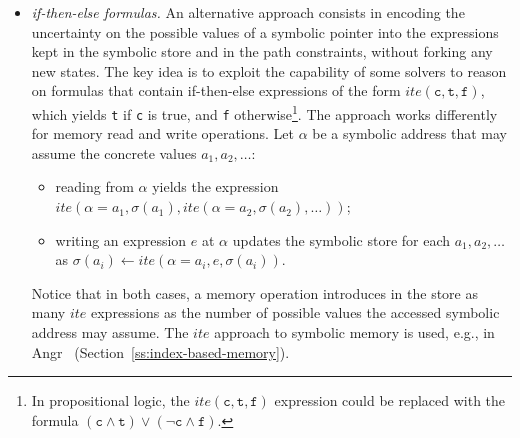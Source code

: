 \begin{itemize}
\item {\em if-then-else formulas.} An alternative approach consists in encoding the uncertainty on the possible values of a symbolic pointer into the expressions kept in the symbolic store and in the path constraints, without forking any new states. The key idea is to exploit the capability of some solvers to reason on formulas that contain if-then-else expressions of the form $ite(\texttt{c}, \texttt{t}, \texttt{f})$, which yields \texttt{t} if \texttt{c} is true, and \texttt{f} otherwise\footnote{In propositional logic, the $ite(\texttt{c}, \texttt{t}, \texttt{f})$ expression could be replaced with the formula $(\texttt{c} \wedge \texttt{t}) \vee (\neg\texttt{c} \wedge \texttt{f})$.}.
The approach works differently for memory read and write operations. Let $\alpha$ be a symbolic address that may assume the concrete values $a_1, a_2, \ldots$:
\begin{itemize}
\item reading from $\alpha$ yields the expression $ite(\alpha=a_1,\sigma(a_1), ite(\alpha=a_2,\sigma(a_2), \ldots))$;
\item writing an expression $e$ at $\alpha$ updates the symbolic store for each $a_1, a_2, \ldots$ as $\sigma(a_i)\gets ite(\alpha=a_i,e,\sigma(a_i))$.
\end{itemize}
Notice that in both cases, a memory operation introduces in the store as many $ite$ expressions as the number of possible values the accessed symbolic address may assume. The $ite$ approach to symbolic memory is used, e.g., in {\sc Angr}~\cite{ANGR-SSP16} (Section~\ref{ss:index-based-memory}).


\end{itemize}
